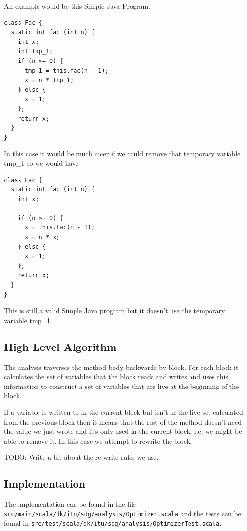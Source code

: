 \documentclass[11pt]{exam}
\begin{document}
An example would be this Simple Java Program. \newline

\begin{lstlisting}
class Fac {
  static int fac (int n) {
    int x;
    int tmp_1;
    if (n >= 0) {
      tmp_1 = this.fac(n - 1);
      x = n * tmp_1;
    } else {
      x = 1;
    };
    return x;
  }
}
\end{lstlisting}

In this case it would be much nicer if we could remove that temporary
variable tmp\_1 so we would have  \newline

\begin{lstlisting}
class Fac {
  static int fac (int n) {
    int x;

    if (n >= 0) {
      x = this.fac(n - 1);
      x = n * x;
    } else {
      x = 1;
    };
    return x;
  }
}
\end{lstlisting}
    
This is still a valid Simple Java program but it doesn't use the temporary 
variable tmp\_1

\subsection{High Level Algorithm}

The analysis traverses the method body backwards by block. For each
block it calculates the set of variables that the block reads and
writes and uses this information to construct a set of variables that
are live at the beginning of the block. \newline

If a variable is written to in the current block but isn't in the live
set calculated from the previous block then it means that the rest of
the method doesn't need the value we just wrote and it's only used in
the current block; i.e. we might be able to remove it. In this case we
attempt to rewrite the block. \newline

TODO: Write a bit about the re-write rules we use.

\subsection{Implementation}

The implementation can be found in the file 
\texttt{src/main/scala/dk/itu/sdg/analysis/Optimizer.scala} and the tests 
can be found in 
\texttt{src/test/scala/dk/itu/sdg/analysis/OptimizerTest.scala}. \newline
\end{document}
